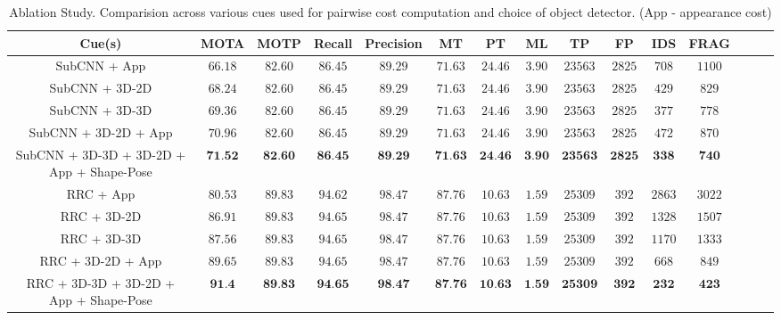 \documentclass[letterpaper, 10 pt, conference]{ieeeconf}
\begin{document}
\begin{table*}[!hbt]
	\centering
    \caption{Ablation Study. Comparision across various cues used for pairwise cost computation and choice of object detector. (App - appearance cost)}
    \begin{adjustbox}{max width=\linewidth}
	\begin{tabular}{|c|c|c|c|c|c|c|c|c|c|c|c|c|c|c|}
		\hline 
        Cue(s) &  MOTA & MOTP & Recall & Precision & MT & PT & ML & TP & FP & IDS & FRAG \\
      	\hline\hline
        
		SubCNN + App & $66.18$ & $82.60$ & $86.45$ & $89.29$ & $71.63$ & $24.46$ & $3.90$ & $23563$ & $2825$ & $708$ & $1100$ \\
            \hline
		SubCNN + 3D-2D & $68.24$ & $82.60$ & $86.45$ & $89.29$ & $71.63$ & $24.46$ & $3.90$ & $23563$ & $2825$ & $429$ & $829$ \\
             	\hline
		SubCNN + 3D-3D & $69.36$ & $82.60$ & $86.45$ & $89.29$ & $71.63$ & $24.46$ & $3.90$ & $23563$ & $2825$ & $377$ & $778$ \\
      \hline
		SubCNN + 3D-2D + App & $70.96$ & $82.60$ & $86.45$ & $89.29$ & $71.63$ & $24.46$ & $3.90$ & $23563$ & $2825$ & $472$ & $870$ \\
    	\hline
		SubCNN + 3D-3D + 3D-2D + App + Shape-Pose & $\textbf{71.52}$ & $\textbf{82.60}$ & $\textbf{86.45}$ & $\textbf{89.29}$ & $\textbf{71.63}$ & $\textbf{24.46}$ & $\textbf{3.90}$ & $\textbf{23563}$ & $\textbf{2825}$ & $\textbf{338}$ & $\textbf{740}$ \\
        
        \hline\hline
    	
		RRC + App & $80.53$ & $89.83$ & $94.62$ & $98.47$ & $87.76$ & $10.63$ & $1.59$ & $25309$ & $392$ & $2863$ & $3022$ \\
            \hline
		RRC + 3D-2D & $86.91$ & $89.83$ & $94.65$ & $98.47$ & $87.76$ & $10.63$ & $1.59$ & $25309$ & $392$ & $1328$ & $1507$ \\
             	\hline
		RRC + 3D-3D & $87.56$ & $89.83$ & $94.65$ & $98.47$ & $87.76$ & $10.63$ & $1.59$ & $25309$ & $392$ & $1170$ & $1333$ \\
      \hline
		RRC + 3D-2D + App & $89.65$ & $89.83$ & $94.65$ & $98.47$ & $87.76$ & $10.63$ & $1.59$ & $25309$ & $392$ & $668$ & $849$ \\
    	\hline
		RRC + 3D-3D + 3D-2D + App + Shape-Pose & $\textbf{91.4}$ & $\textbf{89.83}$ & $\textbf{94.65}$ & $\textbf{98.47}$ & $\textbf{87.76}$ & $\textbf{10.63}$ & $\textbf{1.59}$ & $\textbf{25309}$ & $\textbf{392}$ & $\textbf{232}$ & $\textbf{423}$ \\
        
        \hline
	\end{tabular}
    \end{adjustbox}
    \label{table:ablation}
\end{table*}
\end{document}
